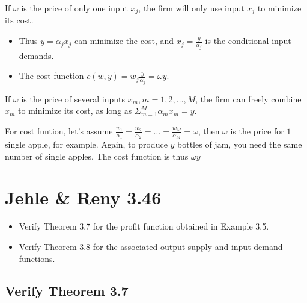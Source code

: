 \documentclass{article}
\begin{document}
\vspace{2mm}

If $\omega$ is the price of only one input $x_j$, the firm will only use input $x_j$ to minimize its cost. 

\begin{itemize}
\item Thus $y = \alpha_j x_j$ can minimize the cost, and $x_j = \frac{y}{\alpha_j}$ is the conditional input demands.
\item The cost function $c(w,y) = w_j \frac{y}{\alpha_j} = \omega y$.
\end{itemize}


If $\omega$ is the price of several inputs $x_m, m = 1,2, \dots, M$, the firm can freely combine $x_m$ to minimize its cost, as long as  $\Sigma^M_{m=1} \alpha_m x_m = y$.

\vspace{2mm}

For cost funtion, let's assume $\frac{w_1}{\alpha_1} = \frac{w_2}{\alpha_2}= \dots =\frac{w_M}{\alpha_M} = \omega$, then $\omega$ is the price for $1$ single apple, for example. Again, to produce $y$ bottles of jam, you need the same number of single apples. The cost function is thus $\omega y$

\section{Jehle \& Reny 3.46}

\begin{itemize}
\item Verify Theorem 3.7 for the profit function obtained in Example 3.5. 
\item Verify Theorem 3.8 for the associated output supply and input demand functions.
\end{itemize}
\subsection{Verify Theorem 3.7}
\end{document}
